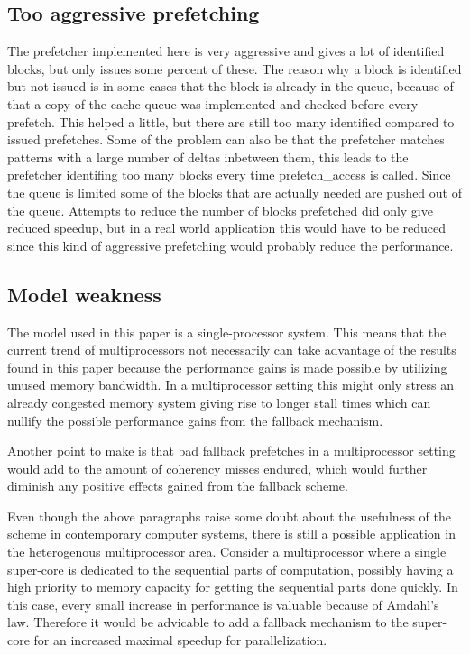 \documentclass[12pt,journal,compsoc]{IEEEtran}
\begin{document}
\subsection{Too aggressive prefetching}
The prefetcher implemented here is very aggressive and gives a lot of
identified blocks, but only issues some percent of these. The reason why a
block is identified but not issued is in some cases that the block is already
in the queue, because of that a copy of the cache queue was implemented
and checked before every prefetch. This helped a little, but there are still
too many identified compared to issued prefetches. Some of the problem can
also be that the prefetcher matches patterns with a large number of deltas
inbetween them, this leads to the prefetcher identifing too many blocks every
time prefetch\_access is called. Since the queue is limited some of the
blocks that are actually needed are pushed out of the queue. Attempts to
reduce the number of blocks prefetched did only give reduced speedup, but
in a real world application this would have to be reduced since this kind of
aggressive prefetching would probably reduce the performance.

\subsection{Model weakness}
The model used in this paper is a single-processor system.
This means that the current trend of multiprocessors not
necessarily can take advantage of the results found in
this paper because the performance gains is made possible
by utilizing unused memory bandwidth. In a multiprocessor
setting this might only stress an already congested memory
system giving rise to longer stall times which can nullify
the possible performance gains from the fallback mechanism.

Another point to make is that bad fallback prefetches in a
multiprocessor setting would add to the amount of coherency
misses endured, which would further diminish any positive
effects gained from the fallback scheme.

Even though the above paragraphs raise some doubt about
the usefulness of the scheme in contemporary computer systems,
there is still a possible application in the heterogenous
multiprocessor area. Consider a multiprocessor where a single super-core
is dedicated to the sequential parts of computation, possibly having a
high priority to memory capacity for getting the sequential parts done quickly.
In this case, every small increase in performance is valuable
because of Amdahl's law. Therefore it would be advicable to add
a fallback mechanism to the super-core for an increased maximal
speedup for parallelization.
\end{document}
